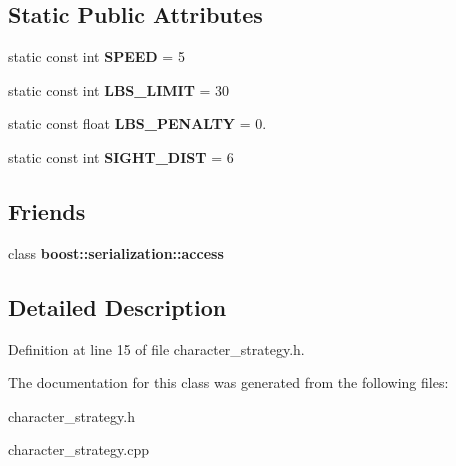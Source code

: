 \subsection*{Static Public Attributes}
\begin{DoxyCompactItemize}
\item 
\hypertarget{class_character_strategy_a3d875212b4e820c51815a681453766c6}{}\label{class_character_strategy_a3d875212b4e820c51815a681453766c6} 
static const int {\bfseries S\+P\+E\+ED} = 5
\item 
\hypertarget{class_character_strategy_a1339d2601c817a30bd10eececa301623}{}\label{class_character_strategy_a1339d2601c817a30bd10eececa301623} 
static const int {\bfseries L\+B\+S\+\_\+\+L\+I\+M\+IT} = 30
\item 
\hypertarget{class_character_strategy_aa883d449ed36b2ffb657db37d7f8a0d5}{}\label{class_character_strategy_aa883d449ed36b2ffb657db37d7f8a0d5} 
static const float {\bfseries L\+B\+S\+\_\+\+P\+E\+N\+A\+L\+TY} = 0.
\item 
\hypertarget{class_character_strategy_ae3704c4b8a67003f118a230684c8eb84}{}\label{class_character_strategy_ae3704c4b8a67003f118a230684c8eb84} 
static const int {\bfseries S\+I\+G\+H\+T\+\_\+\+D\+I\+ST} = 6
\end{DoxyCompactItemize}
\subsection*{Friends}
\begin{DoxyCompactItemize}
\item 
\hypertarget{class_character_strategy_ac98d07dd8f7b70e16ccb9a01abf56b9c}{}\label{class_character_strategy_ac98d07dd8f7b70e16ccb9a01abf56b9c} 
class {\bfseries boost\+::serialization\+::access}
\end{DoxyCompactItemize}


\subsection{Detailed Description}


Definition at line 15 of file character\+\_\+strategy.\+h.



The documentation for this class was generated from the following files\+:\begin{DoxyCompactItemize}
\item 
character\+\_\+strategy.\+h\item 
character\+\_\+strategy.\+cpp\end{DoxyCompactItemize}
